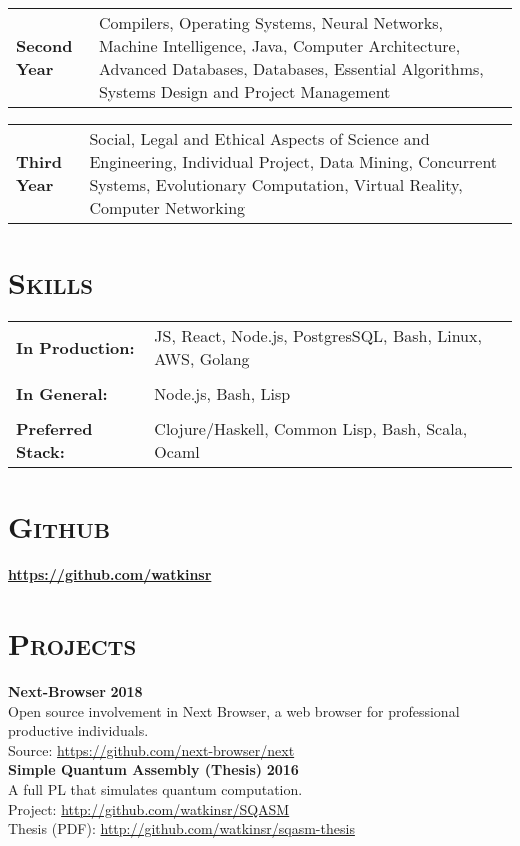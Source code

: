 \documentclass[line, margin, 10pt]{res}
\begin{document}
\begin{resume}
\begin{tabular}[t]{@{} p{1.2in} p{4.5in} @{}}  
\bf{Second Year}  & Compilers,
  Operating Systems,
  Neural Networks,
  Machine Intelligence,
  Java,
  Computer Architecture,
  Advanced Databases,
  Databases,
  Essential Algorithms,
  Systems Design and Project Management
\end{tabular}

\begin{tabular}[t]{@{} p{1.2in} p{4.5in} @{}}  
\bf{Third Year}  & Social, Legal and Ethical Aspects of Science and Engineering,
  Individual Project,
  Data Mining,
  Concurrent Systems,  
  Evolutionary Computation,
  Virtual Reality,
  Computer Networking
\end{tabular}

\section{\textsc{Skills}}
   \begin{tabular}[t]{@{} p{1.2in} p{3.75in} @{}}
     \bf{In Production:} & JS, React, Node.js, PostgresSQL, Bash, Linux, AWS, Golang \\
    \\
    \bf{In General:} & Node.js, Bash, Lisp  \\
    \\
    \bf{Preferred Stack:} & Clojure/Haskell, Common Lisp, Bash, Scala, Ocaml \\
 \end{tabular}

\section{\textsc{Github}}
{\bf \url{https://github.com/watkinsr}}\\

\section{\textsc{Projects}}

{\bf Next-Browser} {\bf \hfill 2018}\\
Open source involvement in Next Browser, a web browser for professional productive individuals.\\
Source: \url{https://github.com/next-browser/next}\\

{\bf Simple Quantum Assembly (Thesis)} {\bf \hfill 2016}\\
A full PL that simulates quantum computation.\\
Project: \url{http://github.com/watkinsr/SQASM}\\
Thesis (PDF): \url{http://github.com/watkinsr/sqasm-thesis}\\


\end{resume}
\end{document}
